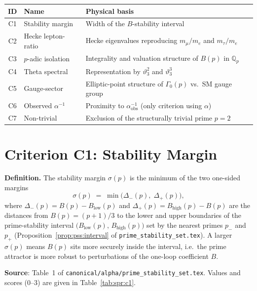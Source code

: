 \documentclass[12pt,a4paper]{article}
\theoremstyle{definition}
\theoremstyle{remark}
\newcommand{\QQ}{\mathbb{Q}}
\begin{document}
\begin{center}
\renewcommand{\arraystretch}{1.35}
\begin{tabular}{clp{7.2cm}}
\toprule
ID & Name & Physical basis \\
\midrule
C1 & Stability margin      & Width of the $B$-stability interval \\
C2 & Hecke lepton-ratio    & Hecke eigenvalues reproducing $m_\mu/m_e$ and $m_\tau/m_e$ \\
C3 & $p$-adic isolation    & Integrality and valuation structure of $B(p)$ in $\QQ_p$ \\
C4 & Theta spectral        & Representation by $\vartheta_3^2$ and $\vartheta_3^3$ \\
C5 & Gauge-sector          & Elliptic-point structure of $\Gamma_0(p)$ vs.\ SM gauge group \\
C6 & Observed $\alpha^{-1}$& Proximity to $\alpha^{-1}_{\mathrm{obs}}$ (only criterion using $\alpha$) \\
C7 & Non-trivial           & Exclusion of the structurally trivial prime $p = 2$ \\
\bottomrule
\end{tabular}
\end{center}

\section{Criterion C1: Stability Margin}
\label{sec:spr:c1}

\textbf{Definition.}
The stability margin $\sigma(p)$ is the minimum of the two one-sided margins
\[
  \sigma(p) \;=\; \min\!\bigl(\Delta_-(p),\;\Delta_+(p)\bigr),
\]
where $\Delta_-(p) = B(p) - B_{\mathrm{low}}(p)$ and $\Delta_+(p) =
B_{\mathrm{high}}(p) - B(p)$ are the distances from $B(p) = (p+1)/3$ to
the lower and upper boundaries of the prime-stability interval
$\bigl(B_{\mathrm{low}}(p),\,B_{\mathrm{high}}(p)\bigr)$ set by the
nearest primes $p_-$ and $p_+$ (Proposition~\ref{prop:pss:interval} of
\texttt{prime\_stability\_set.tex}).
A larger $\sigma(p)$ means $B(p)$ sits more securely inside the interval,
i.e.\ the prime attractor is more robust to perturbations of the one-loop
coefficient $B$.

\textbf{Source}: Table~1 of \texttt{canonical/alpha/prime\_stability\_set.tex}.
Values and scores ($0$–$3$) are given in Table~\ref{tab:spr:c1}.
\end{document}
